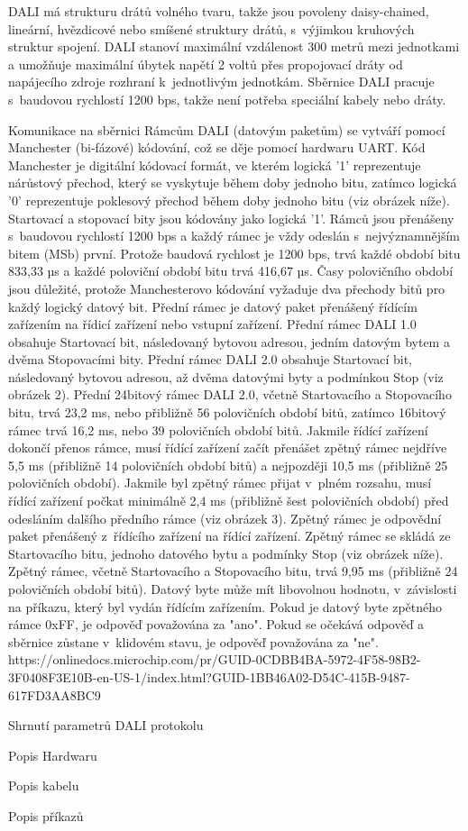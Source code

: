DALI má strukturu drátů volného tvaru, takže jsou povoleny daisy-chained, lineární, hvězdicové nebo smíšené
struktury drátů, s~výjimkou kruhových struktur spojení. DALI stanoví maximální vzdálenost 300 metrů mezi
jednotkami a umožňuje maximální úbytek napětí 2 voltů přes propojovací dráty od napájecího zdroje rozhraní
k~jednotlivým jednotkám. Sběrnice DALI pracuje s~baudovou rychlostí 1200 bps, takže není potřeba speciální
kabely nebo dráty.

\sec Komunikace na sběrnici
Rámcům DALI (datovým paketům) se vytváří pomocí Manchester (bi-fázové) kódování, což se děje pomocí hardwaru UART.
Kód Manchester je digitální kódovací formát, ve kterém logická '1' reprezentuje nárůstový přechod,
který se vyskytuje během doby jednoho bitu, zatímco logická '0' reprezentuje poklesový přechod během
doby jednoho bitu (viz obrázek níže). Startovací a stopovací bity jsou kódovány jako logická '1'.
\medskip
Rámců jsou přenášeny s~baudovou rychlostí 1200 bps a každý rámec je vždy odeslán s~nejvýznamnějším bitem (MSb) první.
Protože baudová rychlost je 1200 bps, trvá každé období bitu 833,33 µs a každé poloviční období bitu trvá 416,67 µs.
Časy polovičního období jsou důležité, protože Manchesterovo kódování vyžaduje dva přechody bitů pro každý logický datový bit.
Přední rámec je datový paket přenášený řídícím zařízením na řídicí zařízení nebo vstupní zařízení.
Přední rámec DALI 1.0 obsahuje Startovací bit, následovaný bytovou adresou, jedním datovým bytem a dvěma Stopovacími bity.
\medskip
Přední rámec DALI 2.0 obsahuje Startovací bit, následovaný bytovou adresou, až dvěma datovými byty a podmínkou Stop (viz obrázek 2).
Přední 24bitový rámec DALI 2.0, včetně Startovacího a Stopovacího bitu, trvá 23,2 ms, nebo přibližně 56 polovičních období bitů,
zatímco 16bitový rámec trvá 16,2 ms, nebo 39 polovičních období bitů. Jakmile řídící zařízení dokončí přenos rámce,
musí řídící zařízení začít přenášet zpětný rámec nejdříve 5,5 ms (přibližně 14 polovičních období bitů)
a nejpozději 10,5 ms (přibližně 25 polovičních období). Jakmile byl zpětný rámec přijat v~plném rozsahu,
musí řídící zařízení počkat minimálně 2,4 ms (přibližně šest polovičních období) před odesláním dalšího
předního rámce (viz obrázek 3).
Zpětný rámec je odpovědní paket přenášený z~řídícího zařízení na řídící zařízení. Zpětný rámec se skládá
ze Startovacího bitu, jednoho datového bytu a podmínky Stop (viz obrázek níže). Zpětný rámec, včetně Startovacího a
Stopovacího bitu, trvá 9,95 ms (přibližně 24 polovičních období bitů). Datový byte může mít libovolnou hodnotu,
v~závislosti na příkazu, který byl vydán řídícím zařízením. Pokud je datový byte zpětného rámce 0xFF,
je odpověď považována za "ano". Pokud se očekává odpověď a sběrnice zůstane v~klidovém stavu, je odpověď považována za "ne".
\medskip
https://onlinedocs.microchip.com/pr/GUID-0CDBB4BA-5972-4F58-98B2-3F0408F3E10B-en-US-1/index.html?GUID-1BB46A02-D54C-415B-9487-617FD3AA8BC9
\medskip

\sec Shrnutí parametrů DALI protokolu

\sec Popis Hardwaru


\sec Popis kabelu

\sec Popis příkazů